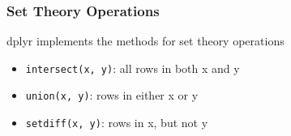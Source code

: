 \documentclass{beamer}
\begin{document}
\begin{frame}
\frametitle{Set Theory Operations}

dplyr implements the methods for set theory operations

\begin{itemize}
	\item \texttt{intersect(x, y)}: all rows in both x and y
	\item \texttt{union(x, y)}: rows in either x or y
	\item \texttt{setdiff(x, y)}: rows in x, but not y
\end{itemize}
\end{frame}
\end{document}
